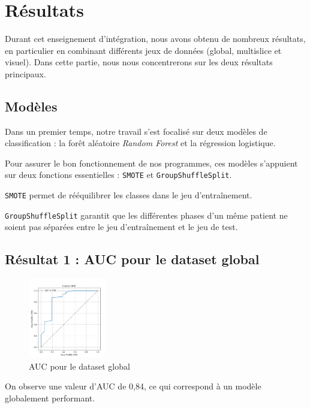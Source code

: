 \chapter{Résultats}
\label{ch:ch3}

Durant cet enseignement d'intégration, nous avons obtenu de nombreux résultats, en particulier en combinant différents jeux de données (global, multislice et visuel).
Dans cette partie, nous nous concentrerons sur les deux résultats principaux.

\section{Modèles}

Dans un premier temps, notre travail s'est focalisé sur deux modèles de classification : la forêt aléatoire \textit{Random Forest} et la régression logistique.

\vspace{0.3cm}

Pour assurer le bon fonctionnement de nos programmes, ces modèles s'appuient sur deux fonctions essentielles : \texttt{SMOTE} et \texttt{GroupShuffleSplit}.

\vspace{0.3cm}

\texttt{SMOTE} permet de rééquilibrer les classes dans le jeu d'entraînement.

\texttt{GroupShuffleSplit} garantit que les différentes phases d'un même patient ne soient pas séparées entre le jeu d'entraînement et le jeu de test.

\section{Résultat 1 : AUC pour le dataset global}

\begin{figure}[H]
\centering
\includegraphics[width=0.3\textwidth]{img/AUC_global.png}
\caption{AUC pour le dataset global}
\label{fig:auc_global}
\end{figure}

\vspace{0.5cm}

On observe une valeur d'AUC de 0{,}84, ce qui correspond à un modèle globalement performant.